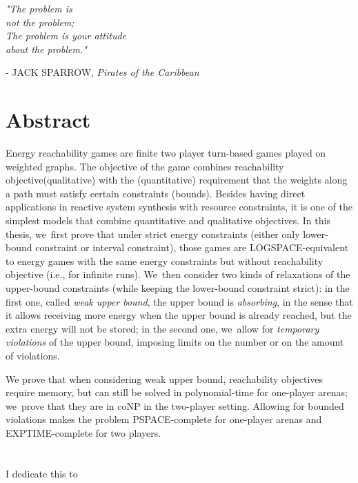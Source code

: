\documentclass[a4paper,12pt, twoside]{book}
\newlength\longest
\theoremstyle{definition}
\begin{document}
\settowidth{}
\begin{center}
\parbox{\longest}{%
  \raggedright{\huge\itshape%
   "The problem is \\ 
  not the problem; \\
  The problem is your attitude \\ 
  about the problem."\par\bigskip
  }   
  \raggedleft\Large\MakeUppercase{- Jack Sparrow}, \textit{Pirates of the Caribbean}\par%
}
\end{center}

\vfill\vfill

\chapter*{Abstract}
Energy reachability games are finite two player turn-based games played on weighted graphs. The objective of the game combines reachability objective(qualitative) with the (quantitative) requirement that the weights along a path must satisfy certain constraints (bounds). Besides having direct applications in reactive system synthesis with resource constraints, it is one of the simplest models that combine quantitative and qualitative objectives.
\vskip 0.5cm
In this thesis, we~first prove that under strict energy constraints (either only
lower-bound constraint or interval constraint), those games are
LOGSPACE-equivalent to energy games with the same energy constraints but without reachability objective (i.e., for infinite
runs). We~then consider two kinds of
relaxations of the upper-bound constraints (while keeping the
lower-bound constraint strict): in the first one, called \emph{weak
upper bound}, the upper bound is \emph{absorbing}, in the sense that
it allows receiving more energy when the upper bound is already
reached, but the extra energy will not be stored; in the second one,
we~allow for \emph{temporary violations} of the upper bound, imposing
limits on the number or on the amount of violations.

%
We prove that when considering weak upper bound, reachability
objectives require memory, but can still be solved in polynomial-time
for one-player arenas; we~prove that they are in coNP in the two-player
setting. Allowing for bounded violations makes the
problem PSPACE-complete for one-player arenas and EXPTIME-complete
for two players.

\chapter*{%
}
I dedicate this to 
 
\end{document}
